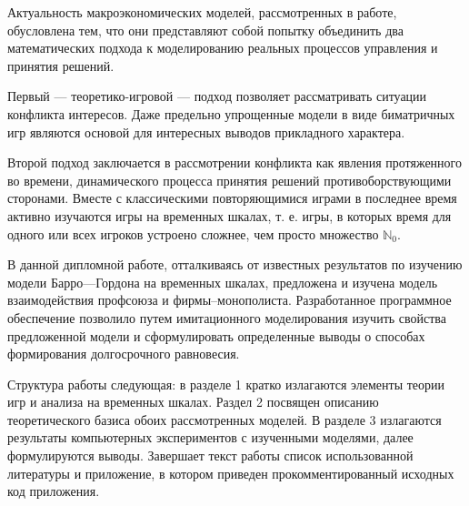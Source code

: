 
Актуальность макроэкономических моделей, рассмотренных в работе, обусловлена
тем, что они представляют собой попытку объединить два математических подхода к
моделированию реальных процессов управления и принятия решений. 

Первый --- теоретико-игровой --- подход позволяет рассматривать ситуации
конфликта интересов. Даже предельно упрощенные модели в виде биматричных игр
являются основой для интересных выводов прикладного характера.

Второй подход заключается в рассмотрении конфликта как явления протяженного во
времени, динамического процесса принятия решений противоборствующими сторонами.
Вместе с классическими повторяющимися играми в последнее время активно
изучаются игры на временных шкалах, т. е. игры, в которых время для одного или
всех игроков устроено сложнее, чем просто множество $\mathbb{N}_0$.

В данной дипломной работе, отталкиваясь от известных результатов по изучению
модели Барро---Гордона на временных шкалах, предложена и изучена модель
взаимодействия профсоюза и фирмы--монополиста.  Разработанное программное
обеспечение позволило путем имитационного моделирования изучить свойства
предложенной модели и сформулировать определенные выводы о способах
формирования долгосрочного равновесия.

Структура работы следующая: в разделе 1 кратко излагаются элементы теории игр и
анализа на временных шкалах. Раздел 2 посвящен описанию теоретического базиса
обоих рассмотренных моделей.  В разделе 3 излагаются результаты компьютерных
экспериментов с изученными моделями, далее формулируются выводы.  Завершает
текст работы список использованной литературы и приложение, в котором приведен
прокомментированный исходных код приложения.
